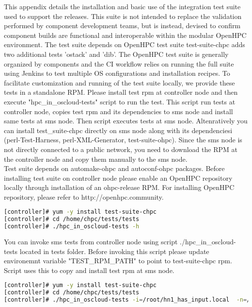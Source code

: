 This appendix details the installation and basic use of the integration test suite used to support the releases. This suite is not intended to replace the validation performed by component development teams, but is instead, devised to confirm component builds are functional and interoperable within the modular OpenHPC environment. The test suite depends on OpenHPC test suite test-suite-chpc adds two additional tests 'ostack' and 'dib'. The OpenHPC test suite is generally organized by components and the CI workflow relies on running the full suite using Jenkins to test multiple OS configurations and installation recipes. To facilitate customization and running of the test suite locally, we provide these tests in a standalone RPM. Please install test rpm at controller node and then execute "hpc\_in\_oscloud-tests" script to run the test. This script run tests at controller node, copies test rpm  and its dependencies to sms node and install same tests at sms node. Then script executes tests at sms node. Altenratively you can install test\_suite-chpc directly on sms node along with its dependenciesi (perl-Test-Harness, perl-XML-Generator, test-suite-ohpc). Since the sms node is not directly connected to a public network, you need to download the RPM at the controller node and copy them manually to the sms node. \\
Test suite depends on automake-ohpc and autoconf-ohpc packages. Before installing test suite on controller node please enable an OpenHPC repository locally through installation of an ohpc-release RPM. For installing OpenHPC repository, please refer to http://openhpc.community.
\begin{lstlisting}[language=bash,keywords={},upquote=true]
[controller]# yum -y install test-suite-chpc
[controller]# cd /home/chpc/tests/tests
[controller]# ./hpc_in_oscloud-tests -h
\end{lstlisting}
You can invoke sms tests from controller node using script ./hpc\_in\_oscloud-tests located in tests folder. Before invoking this script please update environemnt variable "TEST\_RPM\_PATH" to point to test-suite-chpc rpm. Script uses this to copy and install test rpm at sms node.

\begin{lstlisting}[language=bash,keywords={},upquote=true]
[controller]# yum -y install test-suite-chpc
[controller]# cd /home/chpc/tests/tests
[controller]# ./hpc_in_oscloud-tests -i=/root/hn1_has_input.local  -n=/root/hn1_has_inventory -rs
\end{lstlisting}

